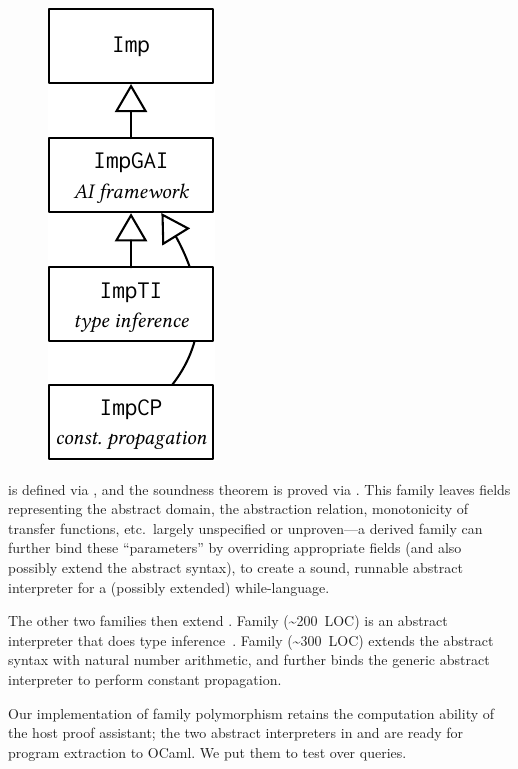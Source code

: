 \begin{figure}
\includegraphics[scale=.68]{graphics/ai-casestudy.pdf}
\end{figure}

\noindent
{} is defined via , and the soundness theorem
is proved via .
This family leaves fields representing the abstract domain, the
abstraction relation, monotonicity of transfer functions, etc.\ 
largely unspecified or unproven---a derived family can further bind
these ``parameters'' by overriding appropriate fields (and also possibly
extend the abstract syntax), to create a sound, runnable abstract
interpreter for a (possibly extended) while-language.

The other two families then extend .
Family  (\textasciitilde200~LOC) is an abstract
interpreter that does type inference~\cite{cousot1997types}.
Family  (\textasciitilde300~LOC) extends the abstract syntax
with natural number arithmetic,
and further binds the generic abstract interpreter to perform constant propagation.

Our implementation of family polymorphism retains the computation
ability of the host proof assistant;
the two abstract interpreters in  and  are
ready for program extraction to OCaml.
We put them to test over queries.

